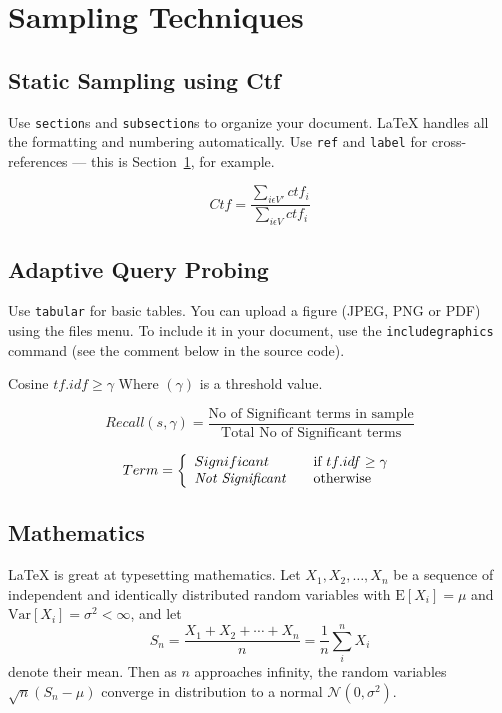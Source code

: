 \documentclass[paper=a4, fontsize=11pt,twoside]{scrartcl}	%
\begin{document}
\section{Sampling Techniques}
\label{sec:examples}


\subsection{Static Sampling using Ctf}

Use \texttt{section}s and \texttt{subsection}s to organize your document. \LaTeX{} handles all the formatting and numbering automatically. Use \texttt{ref} and \texttt{label} for cross-references --- this is Section~\ref{sec:examples}, for example.

$$Ctf = \frac{\sum_{i\epsilon V'}  ctf_i}{\sum_{i\epsilon V} ctf_i}$$
     

\subsection{Adaptive Query Probing}

Use \texttt{tabular} for basic tables. You can upload a figure (JPEG, PNG or PDF) using the files menu. To include it in your document, use the \texttt{includegraphics} command (see the comment below in the source code).

Cosine $tf.idf \geq \gamma $  Where $(\gamma)$ is a threshold value.

$$Recall(s,\gamma) = \frac{\text{No of Significant terms in sample}}{\text{Total No of Significant terms}}$$



\[ Term = \left\{ 
  \begin{array}{l l}
    Significant & \quad \text{if $tf.idf \geq \gamma$}\\
    \textit{Not Significant} & \quad \text{otherwise}
  \end{array} \right.\]




\subsection{Mathematics}

\LaTeX{} is great at typesetting mathematics. Let $X_1, X_2, \ldots, X_n$ be a sequence of independent and identically distributed random variables with $\text{E}[X_i] = \mu$ and $\text{Var}[X_i] = \sigma^2 < \infty$, and let
$$S_n = \frac{X_1 + X_2 + \cdots + X_n}{n}
      = \frac{1}{n}\sum_{i}^{n} X_i$$
denote their mean. Then as $n$ approaches infinity, the random variables $\sqrt{n}(S_n - \mu)$ converge in distribution to a normal $\mathcal{N}(0, \sigma^2)$.
\end{document}
